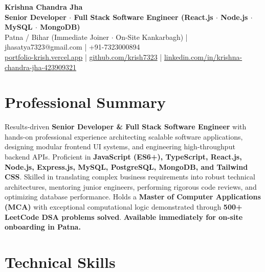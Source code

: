 \documentclass[a4paper,10pt]{article}
\begin{document}
\begin{center}

    {\LARGE \textbf{Krishna Chandra Jha}} \\[2.5pt]

    \textbf{Senior Developer $\cdot$ Full Stack Software Engineer (React.js $\cdot$ Node.js $\cdot$ MySQL $\cdot$ MongoDB)} \\[3.5pt]

    Patna / Bihar (Immediate Joiner $\cdot$ On-Site Kankarbagh)
    \quad | \quad
    jhasatya7323@gmail.com
    \quad | \quad
    +91-7323000894
    \\[2.5pt]

    \href{https://portfolio-ashen-alpha-dv0whhsamo.vercel.app/}{portfolio-krish.vercel.app}
    \quad | \quad
    \href{https://github.com/krish7323}{github.com/krish7323}
    \quad | \quad
    \href{https://linkedin.com/in/krishna-chandra-jha-423909321}
    {linkedin.com/in/krishna-chandra-jha-423909321}

\end{center}

\section*{Professional Summary}

Results-driven \textbf{Senior Developer \& Full Stack Software Engineer} with hands-on professional experience architecting scalable software applications, designing modular frontend UI systems, and engineering high-throughput backend APIs. Proficient in \textbf{JavaScript (ES6+), TypeScript, React.js, Node.js, Express.js, MySQL, PostgreSQL, MongoDB, and Tailwind CSS}. Skilled in translating complex business requirements into robust technical architectures, mentoring junior engineers, performing rigorous code reviews, and optimizing database performance. Holds a \textbf{Master of Computer Applications (MCA)} with exceptional computational logic demonstrated through \textbf{500+ LeetCode DSA problems solved}. \textbf{Available immediately for on-site onboarding in Patna.}

\section*{Technical Skills}
\end{document}
